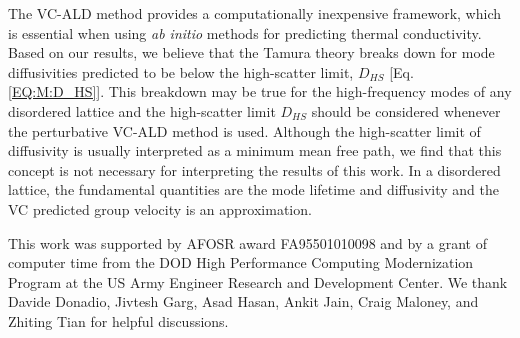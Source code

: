 The VC-ALD method provides a computationally inexpensive framework, 
which is 
essential when using \emph{ab initio} 
methods for predicting thermal conductivity.
\cite{ward_intrinsic_2010,lindsay_thermal_2012,garg_role_2011,shiga_microscopic_2012,tian_phonon_2012,shiomi_thermal_2011,esfarjani_heat_2011,li_thermal_2012,luckyanova_coherent_2012} Based on our results, 
we believe that the Tamura theory breaks down for mode  
diffusivities predicted to be below the high-scatter limit, $D_{HS}$ 
[Eq. \eqref{EQ:M:D_HS}]. 
This breakdown may be true for the high-frequency modes of any 
disordered lattice\cite{sheng_heat_1991} 
and the high-scatter limit $D_{HS}$ should be 
considered whenever the perturbative VC-ALD method is used.
Although the high-scatter limit of 
diffusivity is usually interpreted as a minimum mean free path,
\cite{kittel_interpretation_1949,graebner_phonon_1986,cahill_lattice_1988,sheng_heat_1991} 
we find that this concept is not necessary for interpreting the results 
of this work. In a disordered lattice, the fundamental quantities are 
the mode lifetime and diffusivity\cite{sheng_heat_1991,allen_thermal_1993,allen_diffusons_1999,taraskin_determination_1999,xu_energy_2009,vitelli_heat_2010,beltukov_ioffe_2013} and the 
VC predicted group velocity is an approximation.

\begin{acknowledgements}
This work was supported by AFOSR award FA95501010098 and by a grant 
of computer time from the DOD 
High Performance Computing Modernization Program at the US Army Engineer 
Research and Development Center. 
We thank Davide Donadio, Jivtesh Garg, Asad Hasan, Ankit Jain, Craig Maloney, 
and Zhiting Tian for helpful discussions.
\end{acknowledgements}


